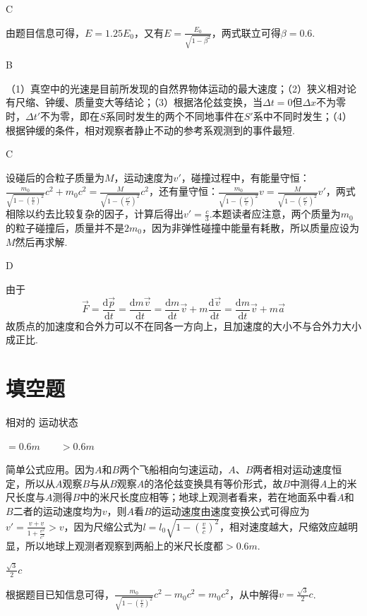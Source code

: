 \documentclass[b5paper,opensource,sourcefont,parskip]{qyxf-book}
\newcommand{\di}[1]{\mathrm{d}#1}
\begin{document}
C

\solve
由题目信息可得，$E=1.25E_0$，又有$E=\frac{E_0}{\sqrt{1-\beta^2}}$，两式联立可得$\beta=0.6$.

B

\solve
（1）真空中的光速是目前所发现的自然界物体运动的最大速度；（2）狭义相对论有尺缩、钟缓、质量变大等结论；（3）根据洛伦兹变换，当$\Delta t=0$但$\Delta x$不为零时，$\Delta t'$不为零，即在$S$系同时发生的两个不同地事件在$S'$系中不同时发生；（4）根据钟缓的条件，相对观察者静止不动的参考系观测到的事件最短.

C

\solve
设碰后的合粒子质量为$M$，运动速度为$v'$，碰撞过程中，有能量守恒：$\frac{m_0}{\sqrt{1-(\frac{v}{c})^2}}c^2+m_0c^2=\frac{M}{\sqrt{1-(\frac{v'}{c})^2}}c^2$，还有量守恒：$\frac{m_0}{\sqrt{1-(\frac{v'}{c})^2}}v=\frac{M}{\sqrt{1-(\frac{v'}{c})^2}}v'$，两式相除以约去比较复杂的因子，计算后得出$v'=\frac{c}{3}$.本题读者应注意，两个质量为$m_0$的粒子碰撞后，质量并不是$2m_0$，因为非弹性碰撞中能量有耗散，所以质量应设为$M$然后再求解.

D

\solve 由于
\begin{equation*}
\overrightarrow{F}=\frac{\di \overrightarrow{p}}{\di t}=\frac{\di m\overrightarrow{v}}{\di t}=\frac{\di m}{\di t}\overrightarrow{v}+m\frac{\di\overrightarrow{v}}{\di t}=\frac{\di m}{\di t}\overrightarrow{v}+m\overrightarrow{a}
\end{equation*}
故质点的加速度和合外力可以不在同各一方向上，且加速度的大小不与合外力大小成正比.

\section{填空题}
 相对的 \qquad 运动状态

 $=0.6m\qquad >0.6m$

\solve 简单公式应用。因为$A$和$B$两个飞船相向匀速运动，$A$、$B$两者相对运动速度恒定，所以从$A$观察$B$与从$B$观察$A$的洛伦兹变换具有等价形式，故$B$中测得$A$上的米尺长度与$A$测得$B$中的米尺长度应相等；地球上观测者看来，若在地面系中看$A$和$B$二者的运动速度均为$v$，则$A$看$B$的运动速度由速度变换公式可得应为$v'=\frac{v+v}{1+\frac{v^2}{c^2}}>v$，因为尺缩公式为$l=l_0\sqrt{1-(\frac{v}{c})^2}$，相对速度越大，尺缩效应越明显，所以地球上观测者观察到两船上的米尺长度都$>0.6m$.

 $\frac{\sqrt{3}}{2}c$

\solve
根据题目已知信息可得，$\frac{m_0}{\sqrt{1-(\frac{v}{c})^2}}c^2-m_0c^2=m_0c^2$，从中解得$v=\frac{\sqrt{3}}{2}c$.
\end{document}
